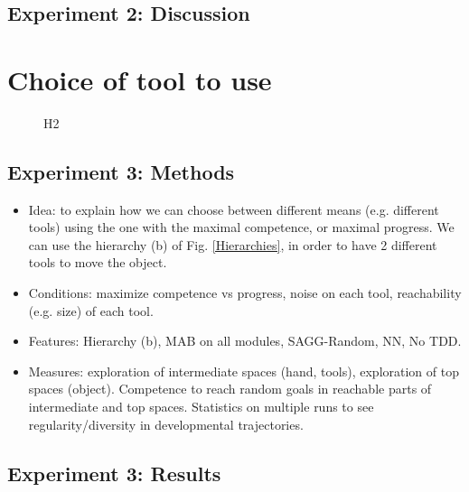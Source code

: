 \documentclass[conference]{include/IEEEtran}
\begin{document}
	
	\subsection{Experiment 2: Discussion}	
	

%
	
\section{Choice of tool to use}

	\begin{figure}[!t]
		\center
		
		\caption{H2}
		\label{H2}					
	\end{figure}
	

	\subsection{Experiment 3: Methods}	
		
		\begin{itemize}
			\item Idea: to explain how we can choose between different means (e.g. different tools) using the one with the maximal competence, or maximal progress.
					We can use the hierarchy (b) of Fig. \ref{Hierarchies}, in order to have 2 different tools to move the object.
			
			\item Conditions: maximize competence vs progress, noise on each tool, reachability (e.g. size) of each tool.
			
			\item Features: Hierarchy (b), MAB on all modules, SAGG-Random, NN, No TDD.
			
			\item Measures: exploration of intermediate spaces (hand, tools), exploration of top spaces (object). Competence to reach random goals in reachable parts of intermediate and top spaces. 
					Statistics on multiple runs to see regularity/diversity in developmental trajectories.
		\end{itemize}
		

	\subsection{Experiment 3: Results}
	
		
	
\end{document}
